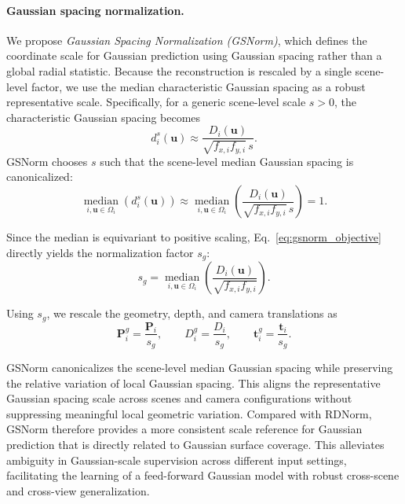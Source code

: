 \paragraph{Gaussian spacing normalization.}
We propose \emph{Gaussian Spacing Normalization (GSNorm)}, which
defines the coordinate scale for Gaussian prediction using Gaussian spacing
rather than a global radial statistic.
Because the reconstruction is rescaled by a single scene-level factor,
we use the median characteristic Gaussian spacing as a robust representative
scale.
Specifically, for a generic scene-level scale $s>0$, the characteristic
Gaussian spacing becomes
\begin{equation}
    d_i^{s}(\mathbf{u})
    \approx
    \frac{D_i(\mathbf{u})}
    {\sqrt{f_{x,i}f_{y,i}}\,s}.
\end{equation}
GSNorm chooses $s$ such that the scene-level median Gaussian spacing is
canonicalized:
\begin{equation}
    \operatorname*{median}_{i,\mathbf{u}\in\Omega_i}
    \left(
        d_i^{s}(\mathbf{u})
    \right)
    \approx
    \operatorname*{median}_{i,\mathbf{u}\in\Omega_i}
    \left(
        \frac{D_i(\mathbf{u})}
        {\sqrt{f_{x,i}f_{y,i}}\,s}
    \right)
    =
    1.
    \label{eq:gsnorm_objective}
\end{equation}

Since the median is equivariant to positive scaling,
Eq.~\ref{eq:gsnorm_objective} directly yields the normalization factor $s_g$:
\begin{equation}
    s_g
    =
    \operatorname*{median}_{i,\mathbf{u}\in\Omega_i}
    \left(
        \frac{D_i(\mathbf{u})}
        {\sqrt{f_{x,i}f_{y,i}}}
    \right).
    \label{eq:gs_scale}
\end{equation}

Using $s_g$, we rescale the geometry, depth, and camera translations as
\begin{equation}
    \mathbf{P}_i^{g}
    =
    \frac{\mathbf{P}_i}{s_g},
    \qquad
    D_i^{g}
    =
    \frac{D_i}{s_g},
    \qquad
    \mathbf{t}_i^{g}
    =
    \frac{\mathbf{t}_i}{s_g}.
    \label{eq:gsnorm}
\end{equation}

GSNorm canonicalizes the scene-level median Gaussian spacing while preserving
the relative variation of local Gaussian spacing.
This aligns the representative Gaussian spacing scale across scenes and camera
configurations without suppressing meaningful local geometric variation.
Compared with RDNorm, GSNorm therefore provides a more consistent scale
reference for Gaussian prediction that is directly related to Gaussian
surface coverage.
This alleviates ambiguity in Gaussian-scale supervision across different
input settings, facilitating the learning of a feed-forward Gaussian
model with robust cross-scene and cross-view generalization.

